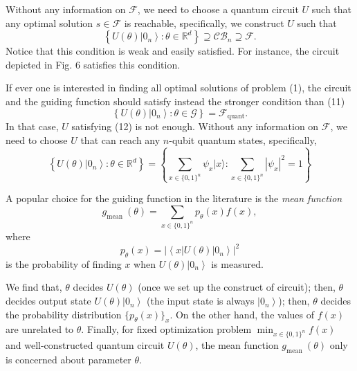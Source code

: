 \begin{remark}
    Without any information on $\mathcal{F}$, we need to choose a quantum circuit $U$ such that any optimal solution $s \in \mathcal{F}$ is reachable, specifically, we construct $U$ such that
\begin{equation*}
\left\{U(\theta)\left|0_{n}\right\rangle: \theta \in \mathbb{R}^{d}\right\} \supseteq \mathcal{C} \mathcal{B}_{n} \supseteq \mathcal{F}. \tag{12}
\end{equation*}
Notice that this condition is weak and easily satisfied. For instance, the circuit depicted in Fig. 6 satisfies this condition. %
\end{remark}

\begin{remark}
If ever one is interested in finding all optimal solutions of problem (1), the circuit and the guiding function should satisfy instead the stronger condition than (11)
\begin{equation*}
\left\{U(\theta)\left|0_{n}\right\rangle: \theta \in \mathcal{G}\right\}=\mathcal{F}_{\text {quant}}. \tag{13}
\end{equation*}
In that case, $U$ satisfying (12) is not enough. Without any information on $\mathcal{F}$, we need to choose $U$ that can reach any $n$-qubit quantum states, specifically, %
$$
\left\{U(\theta)\left|0_{n}\right\rangle: \theta \in \mathbb{R}^{d}\right\}=\left\{\sum_{x \in\{0,1\}^{n}} \psi_{x}|x\rangle: \sum_{x \in\{0,1\}^{n}}\left|\psi_{x}\right|^{2}=1\right\}
$$
\end{remark}

\begin{definition}
A popular choice for the guiding function in the literature is the \textit{mean function}
\begin{equation*}
g_{\text {mean }}(\theta)=\sum_{x \in\{0,1\}^{n}} p_{\theta}(x) f(x), \tag{14}
\end{equation*}
where 
$$
p_{\theta}(x)=\left|\left\langle x|U(\theta)| 0_{n}\right\rangle\right|^{2}
$$
is the probability of finding $x$ when $U(\theta)\left|0_{n}\right\rangle$ is measured.  %
\end{definition}

We find that, $\theta$ decides $U(\theta)$ (once we set up the construct of circuit); then, $\theta$ decides output state $U(\theta)\left|0_{n}\right\rangle$ (the input state is always $\left|0_{n}\right\rangle$); then, $\theta$ decides the probability distribution $\{p_{\theta}(x)\}_{x}$. On the other hand, the values of $f(x)$ are unrelated to $\theta.$ Finally, for fixed optimization problem $\min _{x \in\{0,1\}^{n}} f(x)$ and well-constructed quantum circuit $U(\theta)$, the mean function $g_{\text {mean }}(\theta)$ only is concerned about parameter $\theta.$ 

